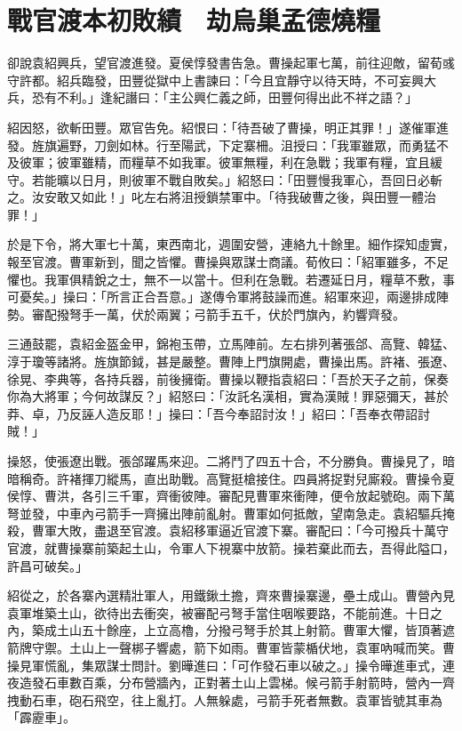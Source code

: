 
\chapter{戰官渡本初敗績　劫烏巢孟德燒糧}

卻說袁紹興兵，望官渡進發。夏侯惇發書告急。曹操起軍七萬，前往迎敵，留荀彧守許都。紹兵臨發，田豐從獄中上書諫曰：「今且宜靜守以待天時，不可妄興大兵，恐有不利。」逢紀譖曰：「主公興仁義之師，田豐何得出此不祥之語？」

紹因怒，欲斬田豐。眾官告免。紹恨曰：「待吾破了曹操，明正其罪！」遂催軍進發。旌旗遍野，刀劍如林。行至陽武，下定寨柵。沮授曰：「我軍雖眾，而勇猛不及彼軍；彼軍雖精，而糧草不如我軍。彼軍無糧，利在急戰；我軍有糧，宜且緩守。若能曠以日月，則彼軍不戰自敗矣。」紹怒曰：「田豐慢我軍心，吾回日必斬之。汝安敢又如此！」叱左右將沮授鎖禁軍中。「待我破曹之後，與田豐一體治罪！」

於是下令，將大軍七十萬，東西南北，週圍安營，連絡九十餘里。細作探知虛實，報至官渡。曹軍新到，聞之皆懼。曹操與眾謀士商議。荀攸曰：「紹軍雖多，不足懼也。我軍俱精銳之士，無不一以當十。但利在急戰。若遷延日月，糧草不敷，事可憂矣。」操曰：「所言正合吾意。」遂傳令軍將鼓譟而進。紹軍來迎，兩邊排成陣勢。審配撥弩手一萬，伏於兩翼；弓箭手五千，伏於門旗內，約響齊發。

三通鼓罷，袁紹金盔金甲，錦袍玉帶，立馬陣前。左右排列著張郃、高覽、韓猛、淳于瓊等諸將。旌旗節鉞，甚是嚴整。曹陣上門旗開處，曹操出馬。許褚、張遼、徐晃、李典等，各持兵器，前後擁衛。曹操以鞭指袁紹曰：「吾於天子之前，保奏你為大將軍；今何故謀反？」紹怒曰：「汝託名漢相，實為漢賊！罪惡彌天，甚於莽、卓，乃反誣人造反耶！」操曰：「吾今奉詔討汝！」紹曰：「吾奉衣帶詔討賊！」

操怒，使張遼出戰。張郃躍馬來迎。二將鬥了四五十合，不分勝負。曹操見了，暗暗稱奇。許褚揮刀縱馬，直出助戰。高覽挺槍接住。四員將捉對兒廝殺。曹操令夏侯惇、曹洪，各引三千軍，齊衝彼陣。審配見曹軍來衝陣，便令放起號砲。兩下萬弩並發，中車內弓箭手一齊擁出陣前亂射。曹軍如何抵敵，望南急走。袁紹驅兵掩殺，曹軍大敗，盡退至官渡。袁紹移軍逼近官渡下寨。審配曰：「今可撥兵十萬守官渡，就曹操寨前築起土山，令軍人下視寨中放箭。操若棄此而去，吾得此隘口，許昌可破矣。」

紹從之，於各寨內選精壯軍人，用鐵鍬土擔，齊來曹操寨邊，壘土成山。曹營內見袁軍堆築土山，欲待出去衝突，被審配弓弩手當住咽喉要路，不能前進。十日之內，築成土山五十餘座，上立高櫓，分撥弓弩手於其上射箭。曹軍大懼，皆頂著遮箭牌守禦。土山上一聲梆子響處，箭下如雨。曹軍皆蒙楯伏地，袁軍吶喊而笑。曹操見軍慌亂，集眾謀士問計。劉曄進曰：「可作發石車以破之。」操令曄進車式，連夜造發石車數百乘，分布營牆內，正對著土山上雲梯。候弓箭手射箭時，營內一齊拽動石車，砲石飛空，往上亂打。人無躲處，弓箭手死者無數。袁軍皆號其車為「霹靂車」。

